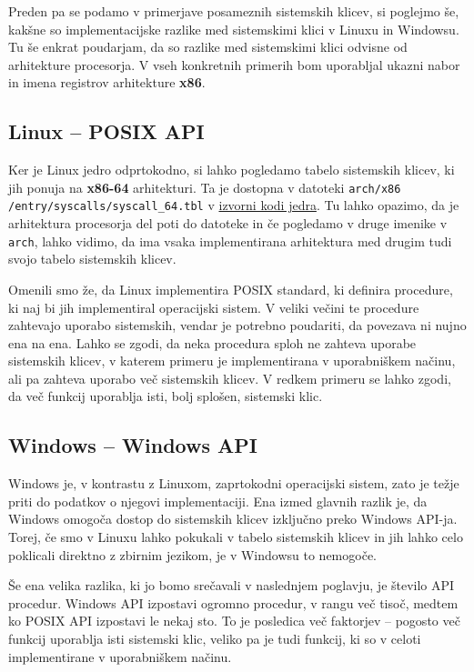 \documentclass[a4paper,12pt,openright]{book}
\begin{document}
Preden pa se podamo v primerjave posameznih sistemskih klicev, si poglejmo še, kakšne so implementacijske razlike med sistemskimi klici v Linuxu in Windowsu.
Tu še enkrat poudarjam, da so razlike med sistemskimi klici odvisne od arhitekture procesorja.
V vseh konkretnih primerih bom uporabljal ukazni nabor in imena registrov arhitekture \textbf{x86}.

\subsection{Linux -- POSIX API}

Ker je Linux jedro odprtokodno, si lahko pogledamo tabelo sistemskih klicev, ki jih ponuja na \textbf{x86-64} arhitekturi.
Ta je dostopna v datoteki \texttt{arch/x86} \texttt{/entry/syscalls/syscall\_64.tbl} v \href{https://github.com/torvalds/linux}{izvorni kodi jedra}.
Tu lahko opazimo, da je arhitektura procesorja del poti do datoteke in če pogledamo v druge imenike v \texttt{arch}, lahko vidimo, da ima vsaka implementirana arhitektura med drugim tudi svojo tabelo sistemskih klicev.

Omenili smo že, da Linux implementira POSIX standard, ki definira procedure, ki naj bi jih implementiral operacijski sistem.
V veliki večini te procedure zahtevajo uporabo sistemskih, vendar je potrebno poudariti, da povezava ni nujno ena na ena.
Lahko se zgodi, da neka procedura sploh ne zahteva uporabe sistemskih klicev, v katerem primeru je implementirana v uporabniškem načinu, ali pa zahteva uporabo več sistemskih klicev.
V redkem primeru se lahko zgodi, da več funkcij uporablja isti, bolj splošen, sistemski klic.

\subsection{Windows -- Windows API}

Windows je, v kontrastu z Linuxom, zaprtokodni operacijski sistem, zato je težje priti do podatkov o njegovi implementaciji.
Ena izmed glavnih razlik je, da Windows omogoča dostop do sistemskih klicev izključno preko Windows API-ja.
Torej, če smo v Linuxu lahko pokukali v tabelo sistemskih klicev in jih lahko celo poklicali direktno z zbirnim jezikom, je v Windowsu to nemogoče.

Še ena velika razlika, ki jo bomo srečavali v naslednjem poglavju, je število API procedur.
Windows API izpostavi ogromno procedur, v rangu več tisoč, medtem ko POSIX API izpostavi le nekaj sto.
To je posledica več faktorjev -- pogosto več funkcij uporablja isti sistemski klic, veliko pa je tudi funkcij, ki so v celoti implementirane v uporabniškem načinu.
\end{document}
